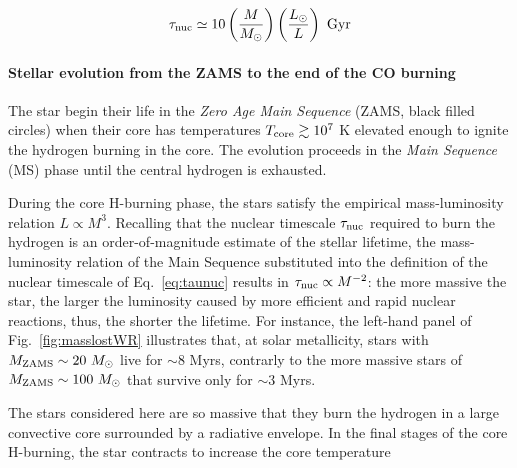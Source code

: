 \documentclass[a4paper,titlepage]{book}     	%
\newcommand{\sun}{\ensuremath{_\odot}}
\newcommand{\mzams}{M_\textup{ZAMS}}
\newcommand{\msun}{\ensuremath{M\sun}}
\begin{document}
\begin{equation}\label{eq:taunuc}
\tau_\textup{nuc} \simeq 10 \left(\frac{M}{M\sun}\right) \left(\frac{L\sun}{L}\right)\ \text{Gyr}
\end{equation}

\paragraph{Stellar evolution from the ZAMS to the end of the CO burning} The star begin their life in the \emph{Zero Age Main Sequence} (ZAMS, black filled circles) when their core has temperatures $T_{\rm core} \gtrsim 10^{7}$ K elevated enough to ignite the hydrogen burning in the core. The evolution proceeds in the \emph{Main Sequence} (MS) phase until the central hydrogen is exhausted. 

During the core H-burning phase, the stars satisfy the empirical mass-luminosity relation $L \propto M^3$. Recalling that the nuclear timescale $\tau_{\rm nuc}$ required to burn the hydrogen is an order-of-magnitude estimate of the stellar lifetime, the mass-luminosity relation of the Main Sequence substituted into the definition of the nuclear timescale of Eq.\ \ref{eq:taunuc} results in $\tau_{\rm nuc} \propto M^{-2}$: the more massive the star, the larger the luminosity caused by more efficient and rapid nuclear reactions, thus, the shorter the lifetime. For instance, the left-hand panel of Fig.\ \ref{fig:masslostWR} illustrates that, at solar metallicity, stars with $\mzams \sim 20~\msun$ live for $\sim 8$ Myrs, contrarly to the more massive stars of $\mzams \sim 100~\msun$ that survive only for $\sim 3$ Myrs.

The stars considered here are so massive that they burn the hydrogen in a large convective core surrounded by a radiative envelope. In the final stages of the core H-burning, the star contracts to increase the core temperature
\end{document}
